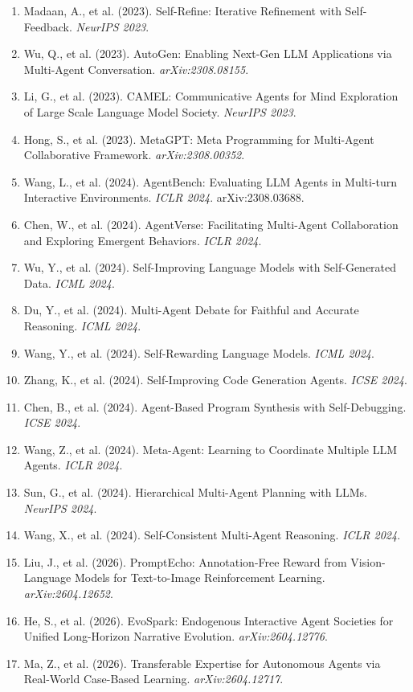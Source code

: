 \documentclass[12pt,a4paper]{article}
\begin{document}
\begin{enumerate}
    \item Madaan, A., et al. (2023). Self-Refine: Iterative Refinement with Self-Feedback. \textit{NeurIPS 2023}.
    \item Wu, Q., et al. (2023). AutoGen: Enabling Next-Gen LLM Applications via Multi-Agent Conversation. \textit{arXiv:2308.08155}.
    \item Li, G., et al. (2023). CAMEL: Communicative Agents for Mind Exploration of Large Scale Language Model Society. \textit{NeurIPS 2023}.
    \item Hong, S., et al. (2023). MetaGPT: Meta Programming for Multi-Agent Collaborative Framework. \textit{arXiv:2308.00352}.
    \item Wang, L., et al. (2024). AgentBench: Evaluating LLM Agents in Multi-turn Interactive Environments. \textit{ICLR 2024}. arXiv:2308.03688.
    \item Chen, W., et al. (2024). AgentVerse: Facilitating Multi-Agent Collaboration and Exploring Emergent Behaviors. \textit{ICLR 2024}.
    \item Wu, Y., et al. (2024). Self-Improving Language Models with Self-Generated Data. \textit{ICML 2024}.
    \item Du, Y., et al. (2024). Multi-Agent Debate for Faithful and Accurate Reasoning. \textit{ICML 2024}.
    \item Wang, Y., et al. (2024). Self-Rewarding Language Models. \textit{ICML 2024}.
    \item Zhang, K., et al. (2024). Self-Improving Code Generation Agents. \textit{ICSE 2024}.
    \item Chen, B., et al. (2024). Agent-Based Program Synthesis with Self-Debugging. \textit{ICSE 2024}.
    \item Wang, Z., et al. (2024). Meta-Agent: Learning to Coordinate Multiple LLM Agents. \textit{ICLR 2024}.
    \item Sun, G., et al. (2024). Hierarchical Multi-Agent Planning with LLMs. \textit{NeurIPS 2024}.
    \item Wang, X., et al. (2024). Self-Consistent Multi-Agent Reasoning. \textit{ICLR 2024}.
    \item Liu, J., et al. (2026). PromptEcho: Annotation-Free Reward from Vision-Language Models for Text-to-Image Reinforcement Learning. \textit{arXiv:2604.12652}.
    \item He, S., et al. (2026). EvoSpark: Endogenous Interactive Agent Societies for Unified Long-Horizon Narrative Evolution. \textit{arXiv:2604.12776}.
    \item Ma, Z., et al. (2026). Transferable Expertise for Autonomous Agents via Real-World Case-Based Learning. \textit{arXiv:2604.12717}.

\end{enumerate}
\end{document}
